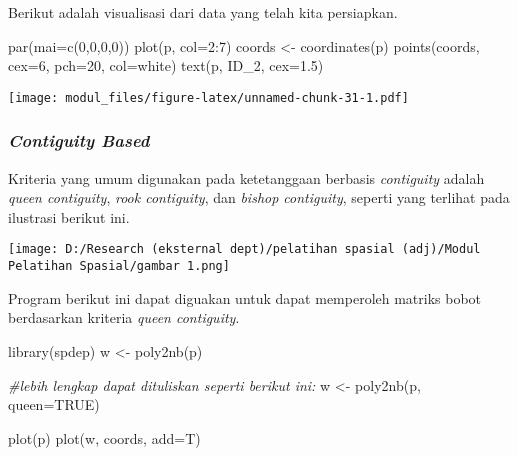 \documentclass[
]{book}
\newenvironment{Shaded}{\begin{snugshade}}{\end{snugshade}}
\newcommand{\AttributeTok}[1]{\textcolor[rgb]{0.77,0.63,0.00}{#1}}
\newcommand{\CommentTok}[1]{\textcolor[rgb]{0.56,0.35,0.01}{\textit{#1}}}
\newcommand{\ConstantTok}[1]{\textcolor[rgb]{0.00,0.00,0.00}{#1}}
\newcommand{\DecValTok}[1]{\textcolor[rgb]{0.00,0.00,0.81}{#1}}
\newcommand{\FloatTok}[1]{\textcolor[rgb]{0.00,0.00,0.81}{#1}}
\newcommand{\FunctionTok}[1]{\textcolor[rgb]{0.00,0.00,0.00}{#1}}
\newcommand{\NormalTok}[1]{#1}
\newcommand{\OtherTok}[1]{\textcolor[rgb]{0.56,0.35,0.01}{#1}}
\newcommand{\SpecialCharTok}[1]{\textcolor[rgb]{0.00,0.00,0.00}{#1}}
\newcommand{\StringTok}[1]{\textcolor[rgb]{0.31,0.60,0.02}{#1}}
\begin{document}
Berikut adalah visualisasi dari data yang telah kita persiapkan.

\begin{Shaded}
\begin{Highlighting}[]
\FunctionTok{par}\NormalTok{(}\AttributeTok{mai=}\FunctionTok{c}\NormalTok{(}\DecValTok{0}\NormalTok{,}\DecValTok{0}\NormalTok{,}\DecValTok{0}\NormalTok{,}\DecValTok{0}\NormalTok{))}
\FunctionTok{plot}\NormalTok{(p, }\AttributeTok{col=}\DecValTok{2}\SpecialCharTok{:}\DecValTok{7}\NormalTok{)}
\NormalTok{coords }\OtherTok{\textless{}{-}} \FunctionTok{coordinates}\NormalTok{(p)}
\FunctionTok{points}\NormalTok{(coords, }\AttributeTok{cex=}\DecValTok{6}\NormalTok{, }\AttributeTok{pch=}\DecValTok{20}\NormalTok{, }\AttributeTok{col=}\StringTok{\textquotesingle{}white\textquotesingle{}}\NormalTok{)}
\FunctionTok{text}\NormalTok{(p, }\StringTok{\textquotesingle{}ID\_2\textquotesingle{}}\NormalTok{, }\AttributeTok{cex=}\FloatTok{1.5}\NormalTok{)}
\end{Highlighting}
\end{Shaded}

\texttt{[image: modul\_files/figure-latex/unnamed-chunk-31-1.pdf]}

\hypertarget{contiguity-based}{%
\subsubsection{\texorpdfstring{\emph{Contiguity Based}}{Contiguity Based}}\label{contiguity-based}}

Kriteria yang umum digunakan pada ketetanggaan berbasis \emph{contiguity} adalah \emph{queen contiguity}, \emph{rook contiguity}, dan \emph{bishop contiguity}, seperti yang terlihat pada ilustrasi berikut ini.

\texttt{[image: D:/Research (eksternal dept)/pelatihan spasial (adj)/Modul Pelatihan Spasial/gambar 1.png]}

Program berikut ini dapat diguakan untuk dapat memperoleh matriks bobot berdasarkan kriteria \emph{queen contiguity}.

\begin{Shaded}
\begin{Highlighting}[]
\FunctionTok{library}\NormalTok{(spdep)}
\NormalTok{w }\OtherTok{\textless{}{-}} \FunctionTok{poly2nb}\NormalTok{(p)}

\CommentTok{\#lebih lengkap dapat dituliskan seperti berikut ini:}
\NormalTok{w }\OtherTok{\textless{}{-}} \FunctionTok{poly2nb}\NormalTok{(p, }\AttributeTok{queen=}\ConstantTok{TRUE}\NormalTok{)}

\FunctionTok{plot}\NormalTok{(p)}
\FunctionTok{plot}\NormalTok{(w, coords, }\AttributeTok{add=}\NormalTok{T)}
\end{Highlighting}
\end{Shaded}
\end{document}
